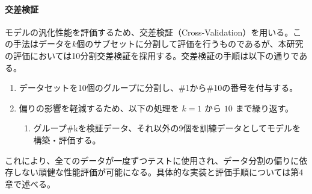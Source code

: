 \paragraph{交差検証}
モデルの汎化性能を評価するため、交差検証（Cross-Validation）を用いる。この手法はデータを$k$個のサブセットに分割して評価を行うものであるが、本研究の評価においては10分割交差検証を採用する。交差検証の手順は以下の通りである。

\begin{enumerate}
  \item データセットを10個のグループに分割し、\#1から\#10の番号を付与する。
  \item 偏りの影響を軽減するため、以下の処理を $k=1$ から $10$ まで繰り返す。
  \begin{enumerate}
    \item グループ\#kを検証データ、それ以外の9個を訓練データとしてモデルを構築・評価する。
  \end{enumerate}
\end{enumerate}

これにより、全てのデータが一度ずつテストに使用され、データ分割の偏りに依存しない頑健な性能評価が可能になる。具体的な実装と評価手順については第4章で述べる。